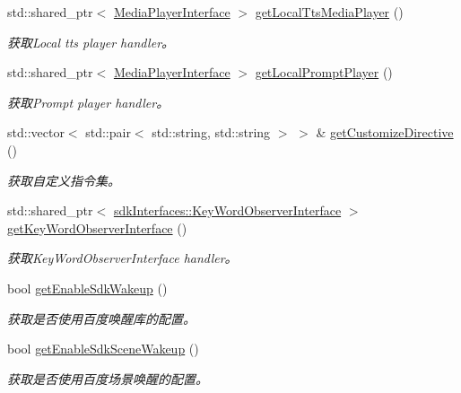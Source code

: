 \begin{DoxyCompactItemize}
std\+::shared\+\_\+ptr$<$ \hyperlink{classduerOSDcsSDK_1_1sdkInterfaces_1_1MediaPlayerInterface}{Media\+Player\+Interface} $>$ \hyperlink{structduerOSDcsSDK_1_1sdkInterfaces_1_1DcsSdkParameters_acda5dfd2e1e9a8eb07d0613b61f37642}{get\+Local\+Tts\+Media\+Player} ()
\begin{DoxyCompactList}\small\item\em 获取\+Local tts player handler。 \end{DoxyCompactList}\item 
std\+::shared\+\_\+ptr$<$ \hyperlink{classduerOSDcsSDK_1_1sdkInterfaces_1_1MediaPlayerInterface}{Media\+Player\+Interface} $>$ \hyperlink{structduerOSDcsSDK_1_1sdkInterfaces_1_1DcsSdkParameters_aeb569e85ff702f3ec9794e99e7e9cab1}{get\+Local\+Prompt\+Player} ()
\begin{DoxyCompactList}\small\item\em 获取\+Prompt player handler。 \end{DoxyCompactList}\item 
std\+::vector$<$ std\+::pair$<$ std\+::string, std\+::string $>$ $>$ \& \hyperlink{structduerOSDcsSDK_1_1sdkInterfaces_1_1DcsSdkParameters_a0622206b1833f62c98e79de840698645}{get\+Customize\+Directive} ()
\begin{DoxyCompactList}\small\item\em 获取自定义指令集。 \end{DoxyCompactList}\item 
std\+::shared\+\_\+ptr$<$ \hyperlink{classduerOSDcsSDK_1_1sdkInterfaces_1_1KeyWordObserverInterface}{sdk\+Interfaces\+::\+Key\+Word\+Observer\+Interface} $>$ \hyperlink{structduerOSDcsSDK_1_1sdkInterfaces_1_1DcsSdkParameters_a50665d3ef7fcfcfbe08b38cfbf9c26cf}{get\+Key\+Word\+Observer\+Interface} ()
\begin{DoxyCompactList}\small\item\em 获取\+Key\+Word\+Observer\+Interface handler。 \end{DoxyCompactList}\item 
bool \hyperlink{structduerOSDcsSDK_1_1sdkInterfaces_1_1DcsSdkParameters_a7260bc59f129332b464b8574ca101662}{get\+Enable\+Sdk\+Wakeup} ()
\begin{DoxyCompactList}\small\item\em 获取是否使用百度唤醒库的配置。 \end{DoxyCompactList}\item 
bool \hyperlink{structduerOSDcsSDK_1_1sdkInterfaces_1_1DcsSdkParameters_a1d73fd99b49c24236a7bd223ea350e10}{get\+Enable\+Sdk\+Scene\+Wakeup} ()
\begin{DoxyCompactList}\small\item\em 获取是否使用百度场景唤醒的配置。 \end{DoxyCompactList}\end{DoxyCompactItemize}


